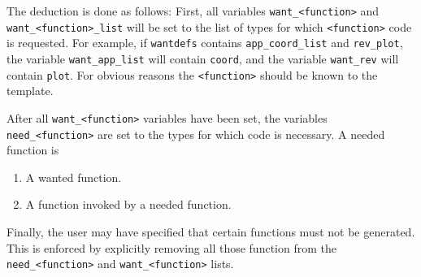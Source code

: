 The deduction is done as follows:
First, all variables \verb!want_<function>! and \verb!want_<function>_list!
will be set to the list of types for which \verb!<function>! code
is requested.
For example, if {\tt wantdefs} contains \verb!app_coord_list! and
\verb!rev_plot!, the variable \verb!want_app_list! will contain
{\tt coord}, and the variable \verb!want_rev! will contain \verb!plot!.
For obvious reasons the \verb!<function>! should be known to the template.
\par
After all \verb!want_<function>! variables have been set, the variables
\verb!need_<function>! are set to the types for which code is necessary.
A needed function is
\begin{enumerate}
\item A wanted function.
\item A function invoked by a needed function.
\end{enumerate}
\par
Finally, the user may have specified that certain functions must not be
generated.
This is enforced by explicitly removing all those function from the
\verb!need_<function>! and \verb!want_<function>! lists. 
